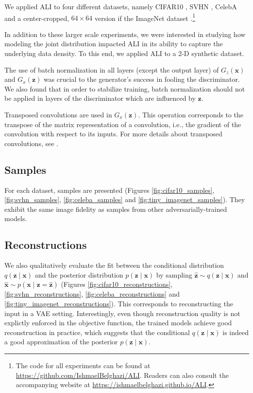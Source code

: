 \documentclass{article}
\begin{document}
We applied ALI to four different datasets, namely CIFAR10
\citep{krizhevsky2009learning}, SVHN \citep{netzer2011reading}, CelebA
\citep{liu2015deep} and a center-cropped, $64 \times 64$ version if the ImageNet
dataset \citep{russakovsky2015imagenet}.\footnote{
    The code for all experiments can be found at
    \url{https://github.com/IshmaelBelghazi/ALI}. Readers can also consult the
    accompanying website at \url{https://ishmaelbelghazi.github.io/ALI}.}

In addition to these larger scale experiments, we were interested in studying
how modeling the joint distribution impacted ALI in its ability to capture the
underlying data density. To this end, we applied ALI to a 2-D synthetic
dataset.

The use of batch normalization \citep{ioffe2015batch} in all layers (except the
output layer) of $G_z(\bm{x})$ and $G_x(\bm{z})$ was crucial to the generator's
success in fooling the discriminator. We also found that in order to stabilize
training, batch normalization should not be applied in layers of the
discriminator which are influenced by $\bm{z}$.

Transposed convolutions are used in $G_x(\bm{z})$. This operation corresponds
to the transpose of the matrix representation of a convolution, i.e., the
gradient of the convolution with respect to its inputs. For more details about
transposed convolutions, see \citet{dumoulin2016guide}.

\subsection{Samples}
For each dataset, samples are presented (Figures \ref{fig:cifar10_samples},
\ref{fig:svhn_samples}, \ref{fig:celeba_samples} and
\ref{fig:tiny_imagenet_samples}). They exhibit the same image fidelity as samples
from other adversarially-trained models.

\subsection{Reconstructions}
We also qualitatively evaluate the fit between the conditional distribution
$q(\bm{z} \mid \bm{x})$ and the posterior distribution $p(\bm{z} \mid \bm{x})$
by sampling $\hat{\bm{z}} \sim q(\bm{z} \mid \bm{x})$ and $\hat{\bm{x}} \sim
p(\bm{x} \mid \bm{z} = \hat{\bm{z}})$ (Figures
\ref{fig:cifar10_reconstructions}, \ref{fig:svhn_reconstructions},
\ref{fig:celeba_reconstructions} and \ref{fig:tiny_imagenet_reconstructions}).
This corresponds to reconstructing the input in a VAE setting. Interestingly,
even though reconstruction quality is not explictly enforced in the objective
function, the trained models achieve good reconstruction in practice, which
suggests that the conditional $q(\bm{z} \mid \bm{x})$ is indeed a good
approximation of the posterior $p(\bm{z} \mid \bm{x})$.
\end{document}
